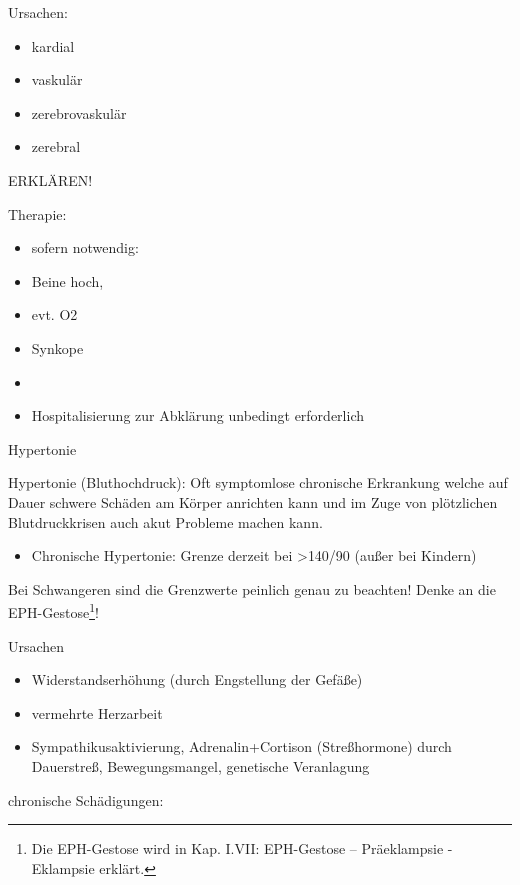 \documentclass{article}
\begin{document}
Ursachen:

\begin{itemize}
\item kardial

\item vaskul\"ar

\item zerebrovaskul\"ar

\item zerebral

\end{itemize}
ERKL\"AREN!

Therapie:

\begin{itemize}
\item sofern notwendig:

\item Beine hoch, 

\item evt. O2

\item Synkope

\item \item Hospitalisierung  zur Abkl\"arung  unbedingt erforderlich

\end{itemize}
Hypertonie

Hypertonie (Bluthochdruck): Oft
symptomlose chronische Erkrankung welche auf Dauer schwere Sch\"aden am
K\"orper anrichten kann und im Zuge von pl\"otzlichen Blutdruckkrisen
auch akut Probleme machen kann. 

\begin{itemize}
\item Chronische Hypertonie: Grenze derzeit bei {\textgreater}140/90 
(au{\ss}er bei Kindern)

\end{itemize}
Bei Schwangeren sind die Grenzwerte peinlich genau zu beachten! Denke an
die EPH-Gestose\footnote{Die EPH-Gestose wird in Kap.
I.VII{\guillemotright}\pageref{bkm:RefHeading39226112}: EPH-Gestose --
Pr\"aeklampsie - Eklampsie erkl\"art.}!

Ursachen

\begin{itemize}
\item Widerstandserh\"ohung (durch Engstellung der Gef\"a{\ss}e)

\item vermehrte Herzarbeit

\item Sympathikusaktivierung, Adrenalin+Cortison (Stre{\ss}hormone)
durch Dauerstre{\ss},  Bewegungsmangel, genetische Veranlagung

\end{itemize}
chronische Sch\"adigungen:
\end{document}
